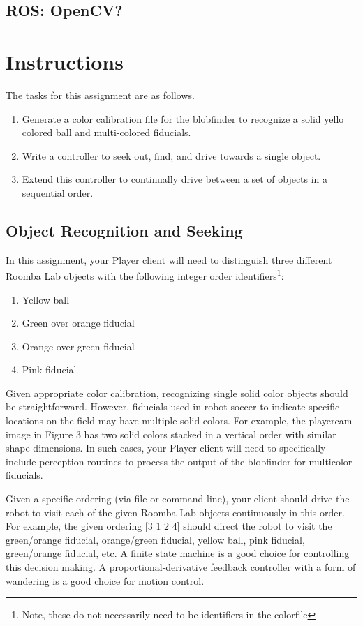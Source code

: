 \subsection{ROS: OpenCV?}

\section{Instructions}

The tasks for this assignment are as follows.

\begin{enumerate}
\item Generate a color calibration file for the blobfinder to recognize a solid yello colored ball and multi-colored fiducials.
\item Write a controller to seek out, find, and drive towards a single object. 
\item Extend this controller to continually drive between a set of objects in a sequential order.
\end{enumerate}


\subsection{Object Recognition and Seeking}

In this assignment, your Player client will need to distinguish three different Roomba Lab objects with the following integer order 
identifiers\footnote{Note, these do not necessarily need to be identifiers in the colorfile}:

\begin{enumerate}
\item Yellow ball 
\item Green over orange fiducial 
\item Orange over green fiducial 
\item Pink fiducial
\end{enumerate}

Given appropriate color calibration, recognizing single solid color objects should be straightforward.  However, fiducials used in 
robot soccer to indicate specific locations on the field may have multiple solid colors.  For example, the playercam image in Figure 3
has two solid colors stacked in a vertical order with similar shape dimensions.  In such cases, your Player 
client will need to specifically include perception routines to process the output of the blobfinder for multicolor fiducials.

Given a specific ordering (via file or command line), your client should drive the robot to visit each of the given Roomba Lab objects 
continuously in this order.  For example, the given ordering [3 1 2 4] should direct the robot to visit the green/orange fiducial, 
orange/green fiducial, yellow ball, pink fiducial, green/orange fiducial, etc.  A finite state machine is a good choice for controlling 
this decision making.  A proportional-derivative feedback controller with a form of wandering is a good choice for motion control.

